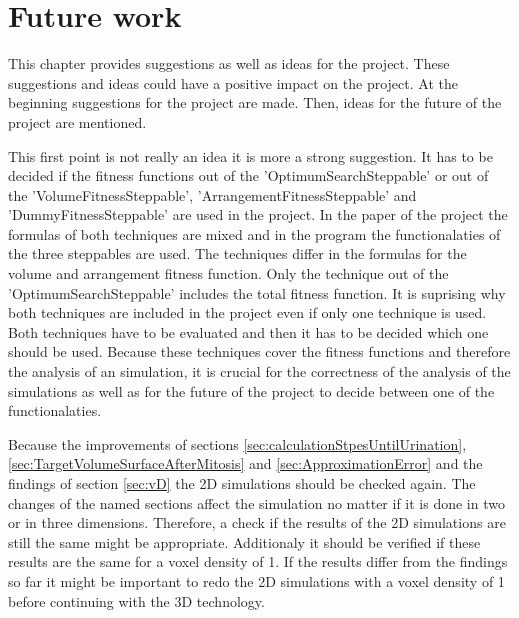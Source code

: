 \chapter{Future work}
This chapter provides suggestions as well as ideas for the project. These suggestions and ideas could have a positive impact on the project. At the beginning suggestions for the project are made. Then, ideas for the future of the project are mentioned.


This first point is not really an idea it is more a strong suggestion. It has to be decided if the fitness functions out of the 'OptimumSearchSteppable' or out of the 'VolumeFitnessSteppable', 'ArrangementFitnessSteppable' and 'DummyFitnessSteppable' are used in the project. In the paper of the project \cite{Torelli2017} the formulas of both techniques are mixed and in the program the functionalaties of the three steppables are used. The techniques differ in the formulas for the volume and arrangement fitness function. Only the technique out of the 'OptimumSearchSteppable' includes the total fitness function. It is suprising why both techniques are included in the project even if only one technique is used. \newline
Both techniques have to be evaluated and then it has to be decided which one should be used. Because these techniques cover the fitness functions and therefore the analysis of an simulation, it is crucial for the correctness of the analysis of the simulations as well as for the future of the project to decide between one of the functionalaties.

Because the improvements of sections \ref{sec:calculationStpesUntilUrination}, \ref{sec:TargetVolumeSurfaceAfterMitosis} and \ref{sec:ApproximationError} and the findings of section \ref{sec:vD} the 2D simulations should be checked again. The changes of the named sections affect the simulation no matter if it is done in two or in three dimensions. Therefore, a check if the results of the 2D simulations are still the same might be appropriate. Additionaly it should be verified if these results are the same for a voxel density of 1. If the results differ from the findings so far it might be important to redo the 2D simulations with a voxel density of 1 before continuing with the 3D technology.


